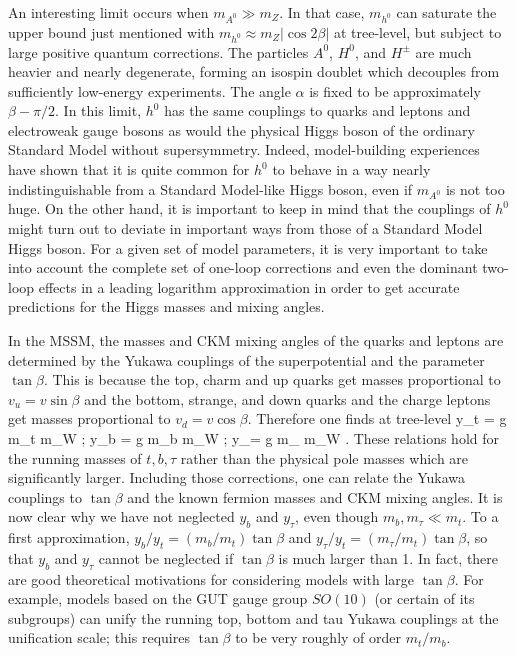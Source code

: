 An interesting limit occurs when $m_{A^0} \gg m_Z$. In that
case, $m_{h^0}$ can saturate the upper bound just mentioned
with $m_{h^0} \approx m_Z |\cos 2\beta|$ at tree-level, but subject
to large positive quantum corrections.
The particles
$A^0$, $H^0$, and $H^\pm$ are much heavier and nearly degenerate,
forming an isospin doublet which decouples from
sufficiently low-energy experiments.
The angle $\alpha$ is
fixed to be approximately $\beta-\pi/2$.
In this limit,
$h^0$ has the same couplings to quarks and leptons and electroweak
gauge bosons as would
the physical Higgs boson of the
ordinary Standard Model without supersymmetry.
Indeed, model-building experiences
have
shown that it is quite common for $h^0$
to behave in a way nearly indistinguishable from a Standard
Model-like Higgs boson, even if $m_{A^0}$ is not
too huge. On the other hand, it is important to keep in mind that
the couplings of $h^0$ might turn out
to deviate in important ways from those of a Standard Model Higgs boson.
For a given set of model parameters, it is very important to take into
account the complete set of one-loop corrections and
even the dominant two-loop effects in a leading logarithm approximation
in order to get accurate predictions for the Higgs masses and mixing
angles.\cite{hcorrections,HHH}

In the MSSM, the masses and CKM mixing angles of the quarks and leptons
are determined by the Yukawa couplings of the superpotential and the
parameter $\tan\beta$. This is because the top, charm and up quarks
get masses proportional to $v_u = v \sin\beta$ and the bottom, strange, and
down
quarks and the charge leptons get masses proportional to $v_d = v
\cos\beta$.
Therefore one finds at tree-level
\beq
y_t = {g m_t\over {} m_W \sin\beta};
\qquad
y_b = {g m_b\over {} m_W \cos\beta};
\qquad
y_\tau = {g m_\tau\over {} m_W \cos\beta}
.\qquad{}
\label{ytbtau}
\eeq
These relations hold for the running masses of $t,b,\tau$ rather than
the physical pole masses which are significantly larger.\cite{polecat}
Including those corrections, one can
relate the Yukawa couplings to $\tan\beta$ and the known fermion masses
and CKM mixing angles. It is now clear why we have not neglected
$y_b$ and $y_\tau$, even though $m_b,m_\tau\ll m_t$. To a first
approximation,
$y_b/y_t =  (m_b/m_t)\tan\beta$ and $y_\tau/y_t =
(m_\tau/m_t)\tan\beta$, so
that $y_b$ and $y_\tau$ cannot be neglected if $\tan\beta$ is much larger
than 1. In fact, there are good theoretical motivations for considering
models with large $\tan\beta$. For example, models based on the
GUT gauge group $SO(10)$ (or certain of its subgroups) can unify the
running top, bottom and tau Yukawa couplings at the unification scale;
this requires $\tan\beta$ to be very roughly of order
$m_t/m_b$.\cite{so10,copw}

